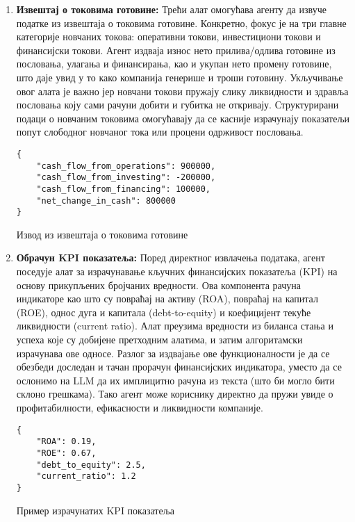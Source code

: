\begin{enumerate}
    \item \textbf{Извештај о токовима готовине:} Трећи алат омогућава агенту да извуче податке из извештаја о токовима готовине. Конкретно, фокус је на три главне категорије новчаних токова: оперативни токови, инвестициони токови и финансијски токови. Агент издваја износ нето прилива/одлива готовине из пословања, улагања и финансирања, као и укупан нето промену готовине, што даје увид у то како компанија генерише и троши готовину. Укључивање овог алата је важно јер новчани токови пружају слику ликвидности и здравља пословања коју сами рачуни добити и губитка не откривају. Структурирани подаци о новчаним токовима омогућавају да се касније израчунају показатељи попут слободног новчаног тока или процени одрживост пословања.

    \begin{listing}[!ht]
    \begin{verbatim}
{
    "cash_flow_from_operations": 900000,
    "cash_flow_from_investing": -200000,
    "cash_flow_from_financing": 100000,
    "net_change_in_cash": 800000
}
    \end{verbatim}
    \caption{Извод из извештаја о токовима готовине}\label{lst:cashflow_json}
    \end{listing}

    \item \textbf{Обрачун KPI показатеља:} Поред директног извлачења података, агент поседује алат за израчунавање кључних финансијских показатеља (KPI) на основу прикупљених бројчаних вредности. Ова компонента рачуна индикаторе као што су повраћај на активу (ROA), повраћај на капитал (ROE), однос дуга и капитала (debt-to-equity) и коефицијент текуће ликвидности (current ratio). Алат преузима вредности из биланса стања и успеха које су добијене претходним алатима, и затим алгоритамски израчунава ове односе. Разлог за издвајање ове функционалности је да се обезбеди доследан и тачан прорачун финансијских индикатора, уместо да се ослонимо на LLM да их имплицитно рачуна из текста (што би могло бити склоно грешкама). Тако агент може кориснику директно да пружи увиде о профитабилности, ефикасности и ликвидности компаније.

    \begin{listing}[!ht]
    \begin{verbatim}
{
    "ROA": 0.19,
    "ROE": 0.67,
    "debt_to_equity": 2.5,
    "current_ratio": 1.2
}
    \end{verbatim}
    \caption{Пример израчунатих KPI показатеља}\label{lst:kpi_json}
    \end{listing}


\end{enumerate}
